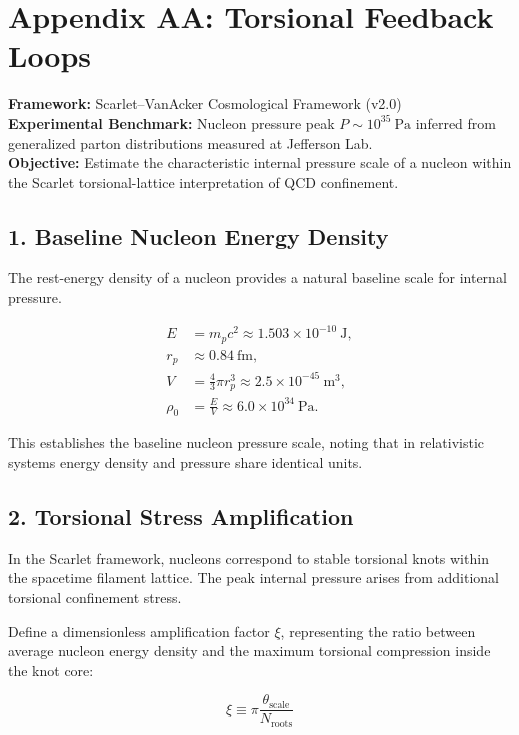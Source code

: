\appendix
\section*{Appendix AA: Torsional Feedback Loops}

\textbf{Framework:} Scarlet--VanAcker Cosmological Framework (v2.0) \\
\textbf{Experimental Benchmark:} Nucleon pressure peak $P \sim 10^{35}\ \mathrm{Pa}$ inferred from generalized parton distributions measured at Jefferson Lab. \\

\textbf{Objective:} Estimate the characteristic internal pressure scale of a nucleon within the Scarlet torsional-lattice interpretation of QCD confinement.

\subsection*{1. Baseline Nucleon Energy Density}
The rest-energy density of a nucleon provides a natural baseline scale for internal pressure.

\begin{align}
E &= m_p c^2 \approx 1.503 \times 10^{-10}\ \mathrm{J},\\
r_p &\approx 0.84\ \mathrm{fm}, \\
V &= \frac{4}{3} \pi r_p^3 \approx 2.5 \times 10^{-45}\ \mathrm{m^3},\\
\rho_0 &= \frac{E}{V} \approx 6.0 \times 10^{34}\ \mathrm{Pa}.
\end{align}

This establishes the baseline nucleon pressure scale, noting that in relativistic systems energy density and pressure share identical units.

\subsection*{2. Torsional Stress Amplification}
In the Scarlet framework, nucleons correspond to stable torsional knots within the spacetime filament lattice. The peak internal pressure arises from additional torsional confinement stress.  

Define a dimensionless amplification factor $\xi$, representing the ratio between average nucleon energy density and the maximum torsional compression inside the knot core:

\begin{equation}
\xi \equiv \pi \frac{\theta_{\mathrm{scale}}}{N_{\mathrm{roots}}}
\end{equation}

